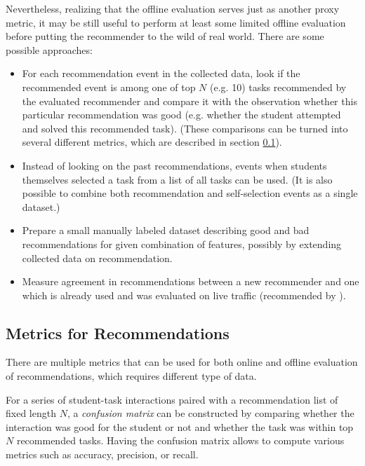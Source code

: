 Nevertheless, realizing that the offline evaluation serves just as another proxy metric,
  it may be still useful to perform at least some limited offline evaluation
  before putting the recommender to the wild of real world.
There are some possible approaches:
\begin{itemize}
  \item For each recommendation event in the collected data,
      look if the recommended event is among one of top $N$ (e.g. 10) tasks
      recommended by the evaluated recommender
      and compare it with the observation whether this particular recommendation
      was good (e.g. whether the student attempted and solved this recommended task).
      (These comparisons can be turned into several different metrics,
       which are described in section \ref{sec:metrics-for-recommendation}).
  \item Instead of looking on the past recommendations,
      events when students themselves selected a task from a list of all tasks can be used.
      (It is also possible to combine both recommendation and self-selection events
       as a single dataset.)
  \item Prepare a small manually labeled dataset describing good and bad recommendations for given combination of features, possibly by extending collected data on recommendation.
  \item Measure agreement in recommendations between a new recommender and one which is already used and was evaluated on live traffic (recommended by \cite[][Rule \#24]{google-ml-rules}).
\end{itemize}



\subsection{Metrics for Recommendations}
\label{sec:metrics-for-recommendation}

There are multiple metrics that can be used for both online and offline
evaluation of recommendations, which requires different type of data.

For a series of student-task interactions paired with a recommendation list of
fixed length $N$, a \emph{confusion matrix} can be constructed by comparing
whether the interaction was good for the student or not and
whether the task was within top $N$ recommended tasks.
Having the confusion matrix allows to compute various metrics such as
accuracy, precision, or recall. %

